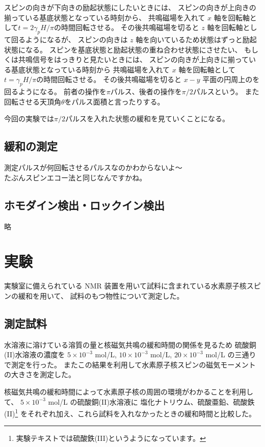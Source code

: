 \documentclass[11pt,dvipdfmx,a4paper]{jsarticle}
\begin{document}
スピンの向きが下向きの励起状態にしたいときには、
スピンの向きが上向きの揃っている基底状態となっている時刻から、
共鳴磁場を入れて \(x\) 軸を回転軸として\(t=2\gamma_pH/\pi\)の時間回転させる。
その後共鳴磁場を切ると \(z\) 軸を回転軸として回るようになるが、
スピンの向きは \(z\) 軸を向いているため状態はずっと励起状態になる。
スピンを基底状態と励起状態の重ね合わせ状態にさせたい、
もしくは共鳴信号をはっきりと見たいときには、
スピンの向きが上向きに揃っている基底状態となっている時刻から
共鳴磁場を入れて \(x\) 軸を回転軸として\(t=\gamma_pH/\pi\)の時間回転させる。
その後共鳴磁場を切ると \(x-y\) 平面の円周上のを回るようになる。
前者の操作を\(\pi\)パルス、後者の操作を\(\pi/2\)パルスという。
また回転させる天頂角\(\theta\)をパルス面積と言ったりする。

今回の実験では\(\pi/2\)パルスを入れた状態の緩和を見ていくことになる。

\subsection{緩和の測定}
測定パルスが何回転させるパルスなのかわからないよ～\\
たぶんスピンエコー法と同じなんですかね。

\subsection{ホモダイン検出・ロックイン検出}
略

\section{実験}
実験室に備えられている NMR 装置を用いて試料に含まれている水素原子核スピンの緩和を用いて、
試料のもつ物性について測定した。
\subsection{測定試料}
水溶液に溶けている溶質の量と核磁気共鳴の緩和時間の関係を見るため
硫酸銅(II)水溶液の濃度を
\(5\times 10^{-3}\) mol/L,
\(10\times 10^{-3}\) mol/L,
\(20\times 10^{-3}\) mol/L
の三通りで測定を行った。
またこの結果を利用して水素原子核スピンの磁気モーメントの大きさを測定した。

核磁気共鳴の緩和時間によって水素原子核の周囲の環境がわかることを利用して、
\(5\times 10^{-3}\) mol/L の硫酸銅(II)水溶液に
塩化ナトリウム、硫酸亜鉛、硫酸鉄(II)\footnote{実験テキストでは硫酸鉄(III)というようになっています。}
をそれぞれ加え、これら試料を入れなかったときの緩和時間と比較した。
\end{document}
